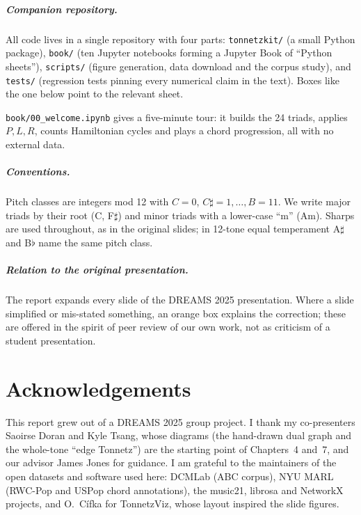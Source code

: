 \documentclass[11pt,a4paper,oneside]{report}
\theoremstyle{definition}
\theoremstyle{remark}
\newcommand{\sheet}[1]{\texttt{book/#1}}
\newcommand{\code}[1]{\texttt{#1}}
\begin{document}
\paragraph{Companion repository.} All code lives in a single repository with four parts:
\code{tonnetzkit/} (a small Python package), \code{book/} (ten Jupyter notebooks forming a Jupyter Book of ``Python
sheets''), \code{scripts/} (figure generation, data download and the corpus study), and \code{tests/} (regression
tests pinning every numerical claim in the text). Boxes like the one below point to the relevant sheet.
\begin{notebookbox}
\sheet{00\_welcome.ipynb} gives a five-minute tour: it builds the 24 triads, applies $P,L,R$, counts Hamiltonian
cycles and plays a chord progression, all with no external data.
\end{notebookbox}

\paragraph{Conventions.} Pitch classes are integers mod 12 with $C=0$, $C\sharp=1,\dots,B=11$. We write major
triads by their root (C, F$\sharp$) and minor triads with a lower-case ``m'' (Am). Sharps are used throughout, as in
the original slides; in 12-tone equal temperament A$\sharp$ and B$\flat$ name the same pitch class.

\paragraph{Relation to the original presentation.} The report expands every slide of the DREAMS 2025 presentation.
Where a slide simplified or mis-stated something, an orange box explains the correction; these are offered in the
spirit of peer review of our own work, not as criticism of a student presentation.

\clearpage
{}










\appendix


\chapter*{Acknowledgements}
This report grew out of a DREAMS 2025 group project. I thank my co-presenters Saoirse Doran and Kyle Tsang, whose
diagrams (the hand-drawn dual graph and the whole-tone ``edge Tonnetz'') are the starting point of Chapters~4 and~7,
and our advisor James Jones for guidance. I am grateful to the maintainers of the open datasets and software used
here: DCMLab (ABC corpus), NYU MARL (RWC-Pop and USPop chord annotations), the music21, librosa and NetworkX
projects, and O.~C\'ifka for TonnetzViz, whose layout inspired the slide figures.



\end{document}
